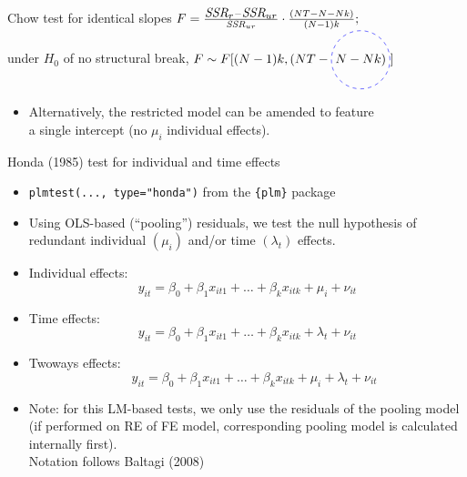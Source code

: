 \documentclass{beamer}
\newcommand{\mytikzmark}[2]{%
  \tikz[remember picture,inner sep=0pt,outer sep=0pt,baseline,anchor=base] 
    \node (#1) {\ensuremath{#2}};}
\newcommand*\circledd[1]{\tikz[baseline=(char.base)]{
    \node[shape=circle,draw=blue, dashed, inner sep=2pt] (char) {#1};}}
\begin{document}
\begin{frame}{Chow test for identical slopes}
\vspace{2.5cm}
\vfill
\bigskip
$F=\frac{ \mytikzmark{SSRr}{\textit{SSR}_r}- \mytikzmark{SSRur}{\textit{SSR}_{ur}}}{\textit{SSR}_{ur}} \cdot \frac{(NT-N-Nk)}{(N-1)k};$ \\
\bigskip
{\small under $H_0$ of no structural break, $F \sim F[(N-1)k, (NT- \mytikzmark{TTk}{\circledd{$N-Nk$)}}]$} \\
\bigskip
\begin{itemize}
\item Alternatively, the restricted model can be amended to feature \\a single intercept (no $\mu_i$ individual effects).
\end{itemize}
\end{frame}
\begin{frame}{Honda (1985) test for individual and time effects}
\begin{itemize}
    \item \texttt{plmtest(..., type="honda")} from the \texttt{\{plm\}} package
    \medskip
    \item Using OLS-based (``pooling'') residuals, we test the null hypothesis of redundant individual $(\mu_i)$ and/or time $ (\lambda_t) $ effects.
    \medskip
    \item Individual effects: 
    $$y_{it} = \beta_{0} + \beta_{1} x_{it1} + \dots + \beta_k x_{itk} + \mu_i + \nu_{it}$$
    \item Time effects: 
    $$y_{it} = \beta_{0} + \beta_{1} x_{it1} + \dots + \beta_k x_{itk} + \lambda_t + \nu_{it}$$  
    \item Twoways effects: 
    $$~~~~~y_{it} = \beta_{0} + \beta_{1} x_{it1} + \dots + \beta_k x_{itk} + \mu_i + \lambda_t + \nu_{it}$$ \item Note: for this LM-based tests, we only use the residuals of the pooling model (if performed on RE of FE model, corresponding pooling model is calculated internally first). \\ \smallskip Notation follows Baltagi (2008)
\end{itemize}
\end{frame}
\end{document}
